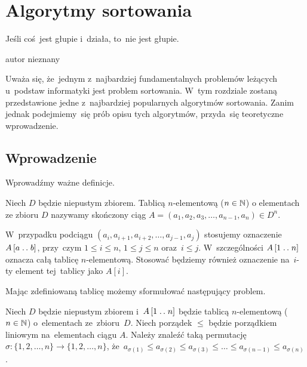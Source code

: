 \chapter{Algorytmy sortowania}

\epigraph{Jeśli coś~jest głupie i~działa, to~nie jest głupie.}{autor nieznany}

Uważa się, że~jednym z~najbardziej fundamentalnych problemów 
leżących u~podstaw informatyki jest problem sortowania. W~tym rozdziale 
zostaną przedstawione jedne z~najbardziej popularnych algorytmów sortowania.
Zanim jednak podejmiemy~się prób opisu tych algorytmów, przyda~się teoretyczne wprowadzenie.

\section{Wprowadzenie}\label{sec:sorting:intro}

Wprowadźmy ważne definicje.

\begin{definition}[Tablica]\label{def:array}
    Niech \( D \) będzie niepustym zbiorem. Tablicą
    \( n \)-elementową (\( n \in \mathbb{N} \)) o elementach
    ze zbioru \( D \) nazywamy skończony ciąg
    \( A = (a_1, a_2, a_3, \dotsc, a_{n - 1}, a_n) \in D^n \).
\end{definition}
\begin{remark}
    W~przypadku podciągu \( (a_i, a_{i + 1}, a_{i + 2}, \dotsc, a_{j - 1}, a_j) \) 
    stosujemy oznaczenie \( A \left[ a \mathrel{{.}\,{.}}\nobreak b \right] \),
    przy~czym \( 1 \le i \le n \), \( 1 \le j \le n \) 
    oraz~\( i \le j \).
    W~szczególności \( A \left[ 1 \mathrel{{.}\,{.}}\nobreak n \right] \) 
    oznacza całą tablicę \( n \)-elementową.
    Stosować będziemy również oznaczenie na~\( i \)-ty 
    element tej~tablicy jako \(A \left[ i \right] \).
\end{remark}
Mając zdefiniowaną tablicę możemy sformułować następujący problem.
\begin{problem}\label{problem:sorting}
    Niech \( D \) będzie niepustym zbiorem 
    i~\( A \left[ 1 \mathrel{{.}\,{.}}\nobreak n \right] \) będzie 
    tablicą \( n \)-elementową (\( n \in \mathbb{N} \)) o~elementach
    ze~zbioru~\( D \).
    Niech porządek \( \le \) będzie porządkiem liniowym 
    na~elementach ciągu \( A \).
    Należy znaleźć taką permutację 
    \( \sigma : \{ 1, 2, \dotsc, n \} \to \{ 1, 2, \dotsc, n \} \), 
    że~\( a_{\sigma(1)} \le a_{\sigma(2)} \le a_{\sigma(3)} 
    \le \dotso \le a_{\sigma(n - 1)} \le a_{\sigma(n)} \).
\end{problem}

